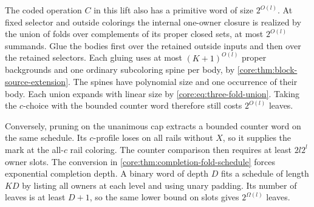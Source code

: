 The coded operation $C$ in this lift also has a primitive
word of size $2^{O(l)}$. At fixed selector and outside
colorings the internal one-owner closure is realized by
the union of folds over complements of its proper closed
sets, at most $2^{O(l)}$ summands. Glue the bodies first
over the retained outside inputs and then over the
retained selectors. Each gluing uses at most $(K+1)^{O(l)}$
proper backgrounds and one ordinary subcoloring spine
per body, by \cref{core:thm:block-source-extension}.
The spines have polynomial size and one occurrence of
their body. Each union expands with linear size by
\cref{core:eq:three-fold-union}. Taking the $c$-choice
with the bounded counter word therefore still costs
$2^{O(l)}$ leaves.

Conversely, pruning on the unanimous cap extracts a
bounded counter word on the same schedule. Its $c$-profile
loses on all rails without $X$, so it supplies the mark
at the all-$c$ rail coloring. The counter comparison
then requires at least $2l2^l$ owner slots. The conversion
in \cref{core:thm:completion-fold-schedule} forces
exponential completion depth. A binary word of depth
$D$ fits a schedule of length $KD$ by listing all owners
at each level and using unary padding. Its number of
leaves is at least $D+1$, so the same lower bound on
slots gives $2^{\Omega(l)}$ leaves.
